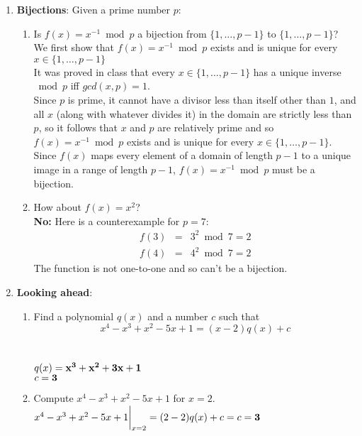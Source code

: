 \documentclass[11pt,fleqn]{article}
\begin{document}
\begin{enumerate}
\newpage
\item \textbf{Bijections}: Given a prime number $p$:
\begin{enumerate}
\item Is $f(x)=x^{-1} \bmod p$ a bijection from $\{1, \ldots, p-1\}$ to $\{1, \ldots, p-1\}$? \\
We first show that $f(x)=x^{-1} \bmod p$ exists and is unique for every $x \in \{1, \ldots, p-1\}$ \\ 
It was proved in class that every $x \in \{1, \ldots, p-1\}$ has a unique inverse $\bmod p$ iff $gcd(x,p) = 1$. \\
Since $p$ is prime, it cannot have a divisor less than itself other than $1$, and all $x$ (along with whatever divides it) in the domain are strictly less than $p$, so it follows that $x$ and $p$ are relatively prime and so $f(x)=x^{-1} \bmod p$ exists and is unique for every $x \in \{1, \ldots, p-1\}$. \\
Since $f(x)$ maps every element of a domain of length $p-1$ to a unique image in a range of length $p-1$, $f(x)=x^{-1} \bmod p$ must be a bijection.
\item How about $f(x)=x^2$? \\
{\bf No:} Here is a counterexample for $p=7$:
\begin{eqnarray*}
f(3) & = & 3^2 \bmod 7 = 2 \\
f(4) & = & 4^2 \bmod 7 = 2
\end{eqnarray*}
The function is not one-to-one and so can't be a bijection.
\end{enumerate}

\newpage
\item \textbf{Looking ahead}:
\begin{enumerate} 
\item 
Find a polynomial $q(x)$ and a number $c$ such that
\[ {x^4 - x^3 + x^2 - 5 x + 1} = (x - 2)q(x) + c \] \\
 \\
$q(x) = {\bf x^3 + x^2 + 3x + 1}$ \\
$c = {\bf 3}$
\item 
Compute $x^4 - x^3 + x^2 - 5x + 1$
for $x = 2$. \\
$x^4 - x^3 + x^2 - 5x + 1 \bigg|_{x=2} = (2-2)q(x) + c = c = {\bf 3}$
\end{enumerate}

\end{enumerate}
\end{document}
